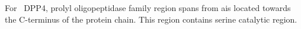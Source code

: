 For~ DPP4, prolyl oligopeptidase family region spans from ais located towards the C-terminus of the protein chain. This region contains serine catalytic region.  